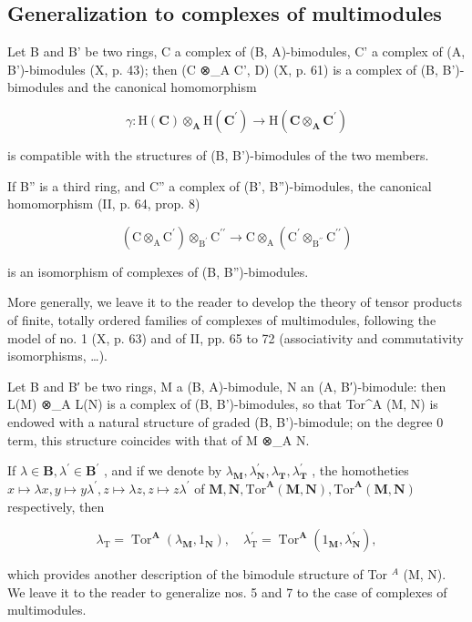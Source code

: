 \subsection{Generalization to complexes of multimodules}

Let B and B' be two rings, C a complex of (B, A)-bimodules, C' a complex of (A, B')-bimodules (X, p. 43); then (C ⊗\_A C', D) (X, p. 61) is a complex of (B, B')-bimodules and the canonical homomorphism

\[
\gamma : \mathrm{H} (\mathbf {C}) \otimes_ {\mathbf {A}} \mathrm{H} (\mathbf {C} ^ {\prime}) \rightarrow \mathrm{H} (\mathbf {C} \otimes_ {\mathbf {A}} \mathbf {C} ^ {\prime})
\]

is compatible with the structures of (B, B')-bimodules of the two members.

If B'' is a third ring, and C'' a complex of (B', B'')-bimodules, the canonical homomorphism (II, p. 64, prop. 8)

\[
\left(\mathrm{C} \otimes_ {\mathrm{A}} \mathrm{C} ^ {\prime}\right) \otimes_ {\mathrm{B} ^ {\prime}} \mathrm{C} ^ {\prime \prime} \rightarrow \mathrm{C} \otimes_ {\mathrm{A}} \left(\mathrm{C} ^ {\prime} \otimes_ {\mathrm{B} ^ {\prime \prime}} \mathrm{C} ^ {\prime \prime}\right)
\]

is an isomorphism of complexes of (B, B'')-bimodules.

More generally, we leave it to the reader to develop the theory of tensor products of finite, totally ordered families of complexes of multimodules, following the model of no. 1 (X, p. 63) and of II, pp. 65 to 72 (associativity and commutativity isomorphisms, \ldots).

Let B and B′ be two rings, M a (B, A)-bimodule, N an (A, B′)-bimodule: then L(M) ⊗\_A L(N) is a complex of (B, B')-bimodules, so that Tor\^{}A (M, N) is endowed with a natural structure of graded (B, B')-bimodule; on the degree 0 term, this structure coincides with that of M ⊗\_A N.

If \(\lambda\in\mathbf{B},\lambda^{\prime}\in\mathbf{B}^{\prime}\) , and if we denote by \(\lambda_{\mathbf{M}},\lambda_{\mathbf{N}}^{\prime},\lambda_{\mathbf{T}},\lambda_{\mathbf{T}}^{\prime}\) , the homotheties \(x\mapsto\lambda x,y\mapsto y\lambda^{\prime},z\mapsto\lambda z,z\mapsto z\lambda^{\prime}\) of \(\mathbf{M},\mathbf{N},\mathrm{Tor}^{\mathbf{A}}(\mathbf{M},\mathbf{N}),\mathrm{Tor}^{\mathbf{A}}(\mathbf{M},\mathbf{N})\) respectively, then

\[
\lambda_ {\mathrm{T}} = \operatorname{Tor} ^ {\mathbf {A}} \left(\lambda_ {\mathbf {M}}, 1 _ {\mathbf {N}}\right), \quad \lambda_ {\mathrm{T}} ^ {\prime} = \operatorname{Tor} ^ {\mathbf {A}} \left(1 _ {\mathbf {M}}, \lambda_ {\mathbf {N}} ^ {\prime}\right),
\]

which provides another description of the bimodule structure of Tor \(^{A}\) (M, N). We leave it to the reader to generalize nos. 5 and 7 to the case of complexes of multimodules.

